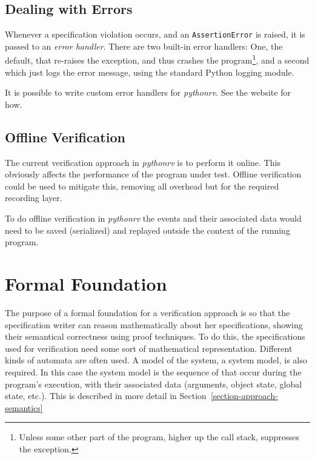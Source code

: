 \documentclass[a4paper,11pt]{kth-mag}
\begin{document}
\subsection{Dealing with Errors}

Whenever a specification violation occurs, and an \texttt{AssertionError} is
raised, it is passed to an \textit{error handler}. There are two built-in error
handlers: One, the default, that re-raises the exception, and thus crashes the
program\footnote{Unless some other part of the program, higher up the call
stack, suppresses the exception.}, and a second which just logs the error
message, using the standard Python logging module.

It is possible to write custom error handlers for \textit{pythonrv}. See the
website for how.


\subsection{Offline Verification}

The current verification approach in \textit{pythonrv} is to perform it online.
This obviously affects the performance of the program under test. Offline
verification could be used to mitigate this, removing all overhead but for the
required recording layer.

To do offline verification in \textit{pythonrv} the events and their associated
data would need to be saved (serialized) and replayed outside the context of
the running program.



\section{Formal Foundation} \label{section-approach-formal-foundation}

The purpose of a formal foundation for a verification approach is so that the
specification writer can reason mathematically about her specifications,
showing their semantical correctness using proof techniques. To do this, the
specifications used for verification need some sort of mathematical
representation. Different kinds of automata are often used. A model of the
system, a system model, is also required. In this case the system model is the
sequence of that occur during the program's execution, with their associated
data (arguments, object state, global state, etc.). This is described in more
detail in Section~\ref{section-approach-semantics}
\end{document}
